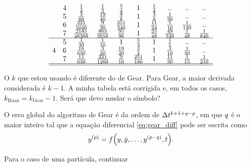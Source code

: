\begin{table}[h]
\begin{equation*}
\begin{array}{cccccccccc}
		& 4 & \frac{1}{4} & \frac{1}{2} & \frac{5}{4} & 1 & \frac{1}{4} & \emptyTableEntry & \emptyTableEntry & \emptyTableEntry \\
		& 5 & \frac{3}{80} & \frac{19}{40} & \frac{9}{8} & 1 & \frac{3}{8} & \frac{1}{20} & \emptyTableEntry & \emptyTableEntry \\
		& 6 & \frac{221}{5040} & \frac{9}{20} & \frac{251}{240} & 1 & \frac{11}{24} & \frac{1}{10} & \frac{1}{120} & \emptyTableEntry \\
		& 7 & \frac{2185}{46368} & \frac{863}{2016} & \frac{95}{96} & 1 & \frac{25}{48} & \frac{49}{336} & \frac{1}{48} & \frac{1}{840} \\
	\hline
		\multirow{3}{*}{4} 
		& 5 & \frac{1}{30} & \frac{1}{10} & 1 & \frac{5}{3} & 1 & \frac{1}{5} & \emptyTableEntry & \emptyTableEntry \\
		& 6 & \frac{16}{630} & \frac{3}{20} & \frac{19}{20} & \frac{3}{2} & 1 & \frac{3}{10} & \frac{1}{30} & \emptyTableEntry \\
		& 7 & \frac{11}{630} & \frac{221}{1260} & \frac{9}{10} & \frac{251}{180} & 1 & \frac{11}{30} & \frac{1}{15} & \frac{1}{210} \\
	\hline
	\hline	
		\end{array}
	\end{equation*}
\end{table}

\alert{O \(k\) que estou usando é diferente do de Gear. Para Gear, a maior derivada considerada é \(k-1\). A minha tabela está corrigida e, em todos os casos, \(k_{\text{Ruan}} = k_{\text{Gear}}-1 \). Será que devo mudar o símbolo?}

O erro global do algoritmo de Gear é da ordem de \(\Delta t^{k+1+q-p}\), em que \(q\) é o maior inteiro tal que a equação diferencial \eqref{eq:gear_diff} pode ser escrita como
\[
	\deriv{\eqOrder}{y} = f\pqty{y, \deriv{1}{y},\dots,\deriv{\eqOrder-\maxDerivOrder}{y}, t}.
\]

Para o caso de uma partícula, \alert{continuar}